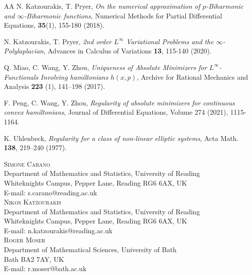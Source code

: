 \documentclass[a4paper,11pt]{article}
\numberwithin{equation}{section}
\theoremstyle{definition}
\begin{document}
\begin{thebibliography}{AA}
N. Katzourakis, T. Pryer, {\it On the numerical approximation of $p$-Biharmonic and $\infty$-Biharmonic functions},
Numerical Methods for Partial Differential Equations, {\bf 35}(1), 155-180 (2018).


N. Katzourakis, T. Pryer, {\it 2nd order $L^\infty$ Variational Problems and the $\infty$-Polylaplacian},
Advances in Calculus of Variations {\bf 13}, 115-140 (2020).



 Q. Miao, C. Wang, Y. Zhou, \emph{Uniqueness of Absolute Minimizers for $ L^{\infty}$-Functionals Involving hamiltonians $h(x,p)$}, Archive for Rational Mechanics and Analysis \textbf{223} (1), 141--198 (2017).

 F. Peng, C. Wang, Y. Zhou, \emph{Regularity of absolute minimizers for continuous convex hamiltonians}, Journal of Differential Equations, Volume 274 (2021), 1115-1164.



K. Uhlenbeck, {\it Regularity for a class of non-linear elliptic systems}, Acta Math. {\bf138}, 219--240 (1977).



\end{thebibliography}

\vspace{3mm}
\textsc{Simone Carano}\\
Department of Mathematics and Statistics, University of Reading\\
Whiteknights Campus, Pepper Lane, Reading RG6 6AX, UK\\
E-mail: s.carano@reading.ac.uk\\

\textsc{Nikos Katzourakis}\\
Department of Mathematics and Statistics, University of Reading\\
Whiteknights Campus, Pepper Lane, Reading RG6 6AX, UK\\
E-mail: n.katzourakis@reading.ac.uk\\

\textsc{Roger Moser}\\
Department of Mathematical Sciences, University of Bath\\
Bath BA2 7AY, UK\\
E-mail: r.moser@bath.ac.uk
\end{document}
